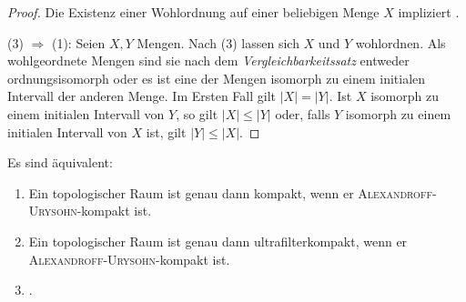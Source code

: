 \begin{proof}
  Die Existenz einer Wohlordnung auf einer beliebigen Menge $X$ impliziert \AC.

  (3) $\Rightarrow$ (1):
  Seien $X,Y$ Mengen. Nach (3) lassen sich $X$ und $Y$ wohlordnen.
  Als wohlgeordnete Mengen sind sie nach dem \textit{Vergleichbarkeitssatz} \cite[S. 28]{bartsch2015allgemeine} entweder ordnungsisomorph oder es ist eine der Mengen isomorph zu einem initialen Intervall der anderen Menge.
  Im Ersten Fall gilt $|X| = |Y|$.
  Ist $X$ isomorph zu einem initialen Intervall von $Y$, so gilt $|X| \leq |Y|$ oder, falls $Y$ isomorph zu einem initialen Intervall von $X$ ist, gilt $|Y| \leq |X|$.
\end{proof}

\newpage
\begin{thm}
  \label{thm:alexandroffUrysohnCompactAC}
  Es sind äquivalent:
  \begin{enumerate}[(1)]
    \item Ein topologischer Raum ist genau dann kompakt, wenn er \textsc{Alexandroff}\hyp{}\textsc{Urysohn}\hyp{}kompakt ist.
    \item Ein topologischer Raum ist genau dann ultrafilterkompakt, wenn er \textsc{Alexandroff}\hyp{}\textsc{Urysohn}\hyp{}kompakt ist.
    \item \AC.
  \end{enumerate}
\end{thm}

